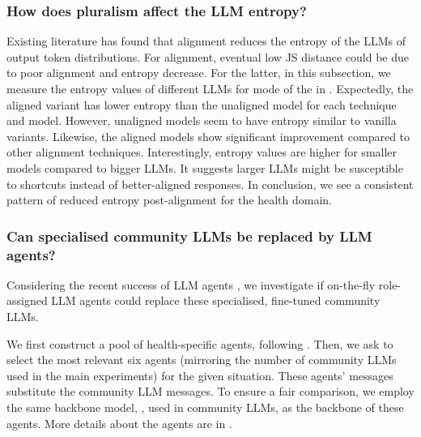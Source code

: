 \subsubsection*{How does \distributional pluralism affect the LLM entropy?}

Existing literature \citep{santurkar2023whose,globalopinionQA,positionpluralistic} has found that alignment reduces the entropy of the LLMs of output token distributions. For \distributional alignment, eventual low JS distance could be due to poor alignment and entropy decrease. For the latter, in this subsection, we measure the entropy values of different LLMs for \distributional mode of the \ourdataset in . Expectedly, the aligned variant has lower entropy than the unaligned model for each technique and model. However, unaligned models seem to have entropy similar to vanilla variants. Likewise, the \modplural aligned models show significant improvement compared to other alignment techniques. Interestingly, entropy values are higher for smaller models compared to bigger LLMs. It suggests larger LLMs might be susceptible to shortcuts instead of better-aligned responses. In conclusion, we see a consistent pattern of reduced entropy post-alignment for the health domain.











\subsubsection*{Can specialised community LLMs be replaced by LLM agents?}




Considering the recent success of LLM agents \citep{tseng2024two,chen2024persona,tang2024medagents}, we investigate if on-the-fly role-assigned LLM agents could replace these specialised, fine-tuned community LLMs. 

We first construct a pool of health-specific agents, following \citep{lu2024llm}. Then, we ask \gptFour to select the most relevant six agents (mirroring the number of community LLMs used in the main experiments) for the given situation. These agents' messages substitute the community LLM messages. To ensure a fair comparison, we employ the same backbone model, \mistral, used in community LLMs, as the backbone of these agents. More details about the agents are in .

